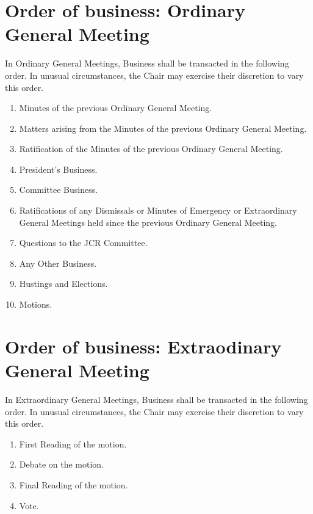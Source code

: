 \section{Order of business: Ordinary General Meeting}
\npara In Ordinary General Meetings, Business shall be transacted in the following order.  In unusual circumstances, the Chair may exercise their discretion to vary this order.
\begin{enumerate}
\item Minutes of the previous Ordinary General Meeting.
\item Matters arising from the Minutes of the previous Ordinary General Meeting.
\item Ratification of the Minutes of the previous Ordinary General Meeting.
\item President's Business.
\item Committee Business.
\item Ratifications of any Dismissals or Minutes of Emergency or Extraordinary General Meetings held since the previous Ordinary General Meeting.
\item Questions to the JCR Committee.
\item Any Other Business.
\item Hustings and Elections.
\item Motions.
\end{enumerate}
\section{Order of business: Extraodinary General Meeting}
\npara In Extraordinary General Meetings, Business shall be transacted in the following order.  In unusual circumstances, the Chair may exercise their discretion to vary this order.
\begin{enumerate}
\item First Reading of the motion.
\item Debate on the motion.
\item Final Reading of the motion.
\item Vote.
\end{enumerate}
